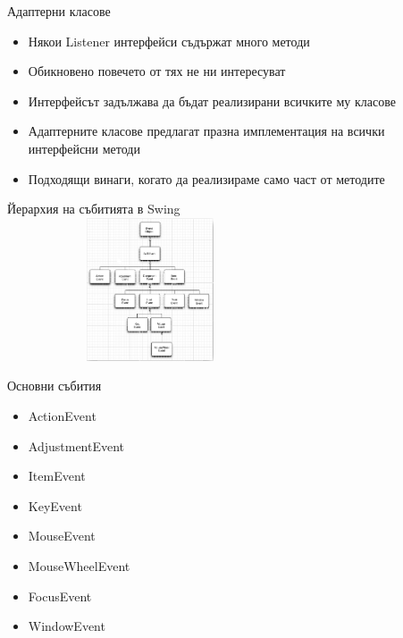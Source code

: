 \documentclass{beamer}
\begin{document}
\begin{frame}{Адаптерни класове}
  \transdissolve
  \begin{itemize}
  \item Някои Listener интерфейси съдържат много методи
  \item Обикновено повечето от тях не ни интересуват
  \item Интерфейсът задължава да бъдат реализирани всичките му класове
  \item Адаптерните класове предлагат празна имплементация на всички
    интерфейсни методи
  \item Подходящи винаги, когато да реализираме само част от методите
  \end{itemize}
\end{frame}


\begin{frame}{Йерархия на събитията в Swing}
  \transdissolve
  \includegraphics[width=320px,height=160px]{images/events.png}  
\end{frame}

\begin{frame}{Основни събития}
  \transdissolve
  \begin{itemize}
  \item ActionEvent
  \item AdjustmentEvent
  \item ItemEvent
  \item KeyEvent
  \item MouseEvent
  \item MouseWheelEvent
  \item FocusEvent
  \item WindowEvent
  \end{itemize}
\end{frame}
\end{document}

